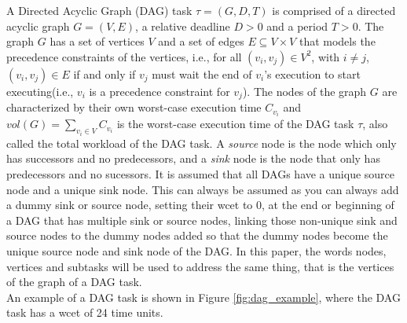 A Directed Acyclic Graph (DAG) task
$\tau = (G, D, T)$ is comprised of 
a directed acyclic graph $G = (V, E)$, a relative deadline $D > 0$ and a period $T > 0$.
The graph $G$ has a set of vertices $V$ and a set of edges $E \subseteq V \times V$
that models the precedence constraints of the vertices,
i.e., for all $(v_i, v_j) \in V^2$, with $i \neq j$, $(v_i, v_j) \in E$ if and only if
$v_j$ must wait the end of $v_i$'s execution to start executing(i.e., $v_i$ is a precedence constraint for $v_j$).
The nodes of the graph $G$ are characterized by their own worst-case execution time $C_{v_i}$ 
and $vol(G) = \sum_{v_i \in V} C_{v_i}$ is the worst-case execution time of the DAG task $\tau$,
also called the total workload of the DAG task.
A \textit{source} node is the node which only has successors 
and no predecessors, and a \textit{sink} node is 
the node that only has predecessors and no sucessors.
It is assumed that all DAGs have a unique source node and a unique sink node.
This can always be assumed as you can always add a dummy sink or source node,
setting their wcet to 0,
at the end or beginning of a DAG that has multiple sink or source nodes,
linking those non-unique sink and source nodes to
the dummy nodes added so that the dummy nodes become the unique source node and sink node
of the DAG.
In this paper, the words nodes, vertices and subtasks will be used
to address the same thing, that is the vertices of the graph of a DAG task.\\

An example of a DAG task is shown in Figure \ref{fig:dag_example},
where the DAG task has a wcet of 24 time units.

